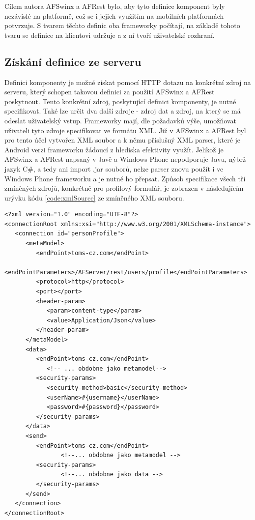 Cílem autora AFSwinx a AFRest bylo, aby tyto definice komponent byly nezávislé na platformě, což se i jejich využitím na mobilních platformách potvrzuje. S tvarem těchto definic oba frameworky počítají, na základě tohoto tvaru se definice na klientovi udržuje a z ní tvoří uživatelské rozhraní. 

\subsection{Získání definice ze serveru}
Definici komponenty je možné získat pomocí HTTP dotazu na konkrétní zdroj na serveru, který schopen takovou definici za použití AFSwinx a AFRest poskytnout. Tento konkrétní zdroj, poskytující definici komponenty, je nutné specifikovat. Také lze určit dva další zdroje - zdroj dat a zdroj, na který se má odeslat uživatelský vstup. Frameworky mají, dle požadavků výše, umožňovat uživateli tyto zdroje specifikovat ve formátu XML. Již v AFSwinx a AFRest byl pro tento účel vytvořen XML soubor a k němu příslušný XML parser, které je Android verzi frameworku žádoucí z hlediska efektivity využít. Jelikož je AFSwinx a AFRest napsaný v Javě a Windows Phone nepodporuje Javu, nýbrž jazyk C\#, a tedy ani import .jar souborů, nelze parser znovu použít i ve Windows Phone frameworku a je nutné ho přepsat. Způsob specifikace všech tří zmíněných zdrojů, konkrétně pro profilový formulář, je zobrazen v následujícím urývku kódu \ref{code:xmlSource} ze zmíněného XML souboru.

\begin{lstlisting}[caption=Ukázka XML specifikace zdrojů,
label={code:xmlSource}, basicstyle=\footnotesize]
<?xml version="1.0" encoding="UTF-8"?>
<connectionRoot xmlns:xsi="http://www.w3.org/2001/XMLSchema-instance">
   <connection id="personProfile">
      <metaModel>
         <endPoint>toms-cz.com</endPoint>
         <endPointParameters>/AFServer/rest/users/profile</endPointParameters>
         <protocol>http</protocol>
         <port></port>
         <header-param>
            <param>content-type</param>
            <value>Application/Json</value>
         </header-param>
      </metaModel>
      <data>
         <endPoint>toms-cz.com</endPoint>
         	<!-- ... obdobne jako metamodel-->
         <security-params>
            <security-method>basic</security-method>
            <userName>#{username}</userName>
            <password>#{password}</password>
         </security-params>
      </data>
      <send>
         <endPoint>toms-cz.com</endPoint>
            	<!--... obdobne jako metamodel -->
         <security-params>
                <!--... obdobne jako data -->
         </security-params>
      </send>
   </connection>
</connectionRoot>
\end{lstlisting}

